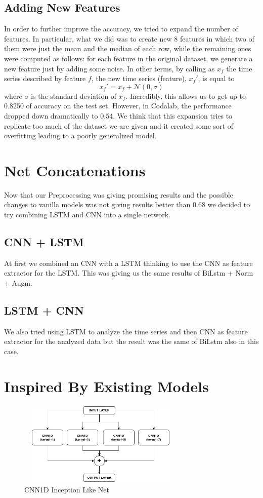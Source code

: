 \documentclass[11pt]{article}
\begin{document}
\subsection{Adding New Features}
In order to further improve the accuracy, we tried to expand the number of features. In particular, what we did was to create new 8 features in which two of them were just the mean and the median of each row, while the remaining ones were computed as follows: for each feature in the original dataset, we generate a new feature just by adding some noise. In other terms, by calling as $x_f$ the time series described by feature $f$, the new time series (feature), $x_f'$, is equal to
\begin{equation*}
    x_f' = x_f + \mathcal{N}(0, \sigma)
\end{equation*}
where $\sigma$ is the standard deviation of $x_f$. Incredibly, this allows us to get up to 0.8250 of accuracy on the test set. However, in Codalab, the performance dropped down dramatically to 0.54. We think that this expansion tries to replicate too much of the dataset we are given and it created some sort of overfitting leading to a poorly generalized model.
\section{Net Concatenations}
Now that our Preprocessing was giving promising results and the possible changes to vanilla models was not giving results better than 0.68
we decided to try combining LSTM and CNN into a single network.
\subsection{CNN + LSTM}
At first we combined an CNN with a LSTM thinking to use the CNN as feature extractor for the LSTM.
This was giving us the same results of BiLstm + Norm + Augm.
\subsection{LSTM + CNN}
We also tried using LSTM to analyze the time series and then CNN as feature extractor for the analyzed data
but the result was the same of BiLstm also in this case.

\section{Inspired By Existing Models}
\begin{figure}[h]
\centering
\includegraphics[width=8cm, height=4cm]{Inception}
\caption{CNN1D Inception Like Net}
\end{figure}
\end{document}
